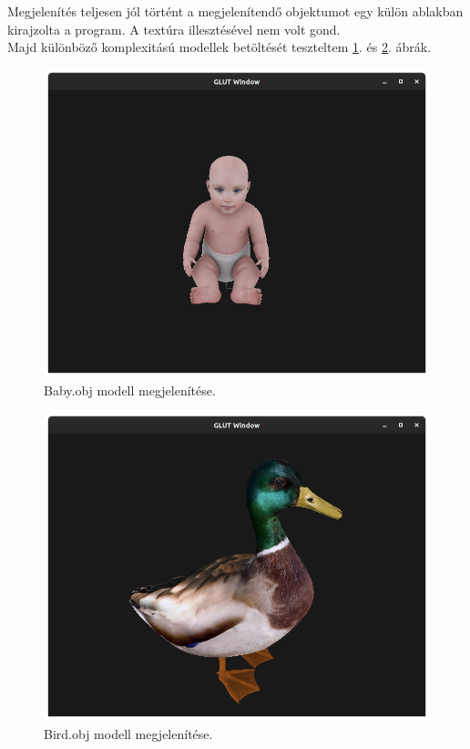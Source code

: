 Megjelenítés teljesen jól történt a megjelenítendő objektumot egy külön ablakban kirajzolta a program. A textúra illesztésével nem volt gond.\\
\newpage
Majd különböző komplexitású modellek betöltését teszteltem \ref{fig:modelbaby}. és  \ref{fig:modelbird}. ábrák.
\bigskip
\begin{figure}[h]
\centering
\includegraphics[scale=0.3]{images/model1.png}
\caption{Baby.obj modell megjelenítése.}
\label{fig:modelbaby}
\end{figure}
\bigskip
\begin{figure}[h]
\centering
\includegraphics[scale=0.3]{images/bird.png}
\caption{Bird.obj modell megjelenítése.}
\label{fig:modelbird}
\end{figure}
\bigskip

